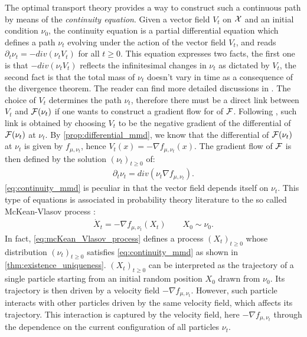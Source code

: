 The optimal transport theory provides a way to construct such a continuous path by means of the \textit{continuity equation}. Given a vector field $V_t$ on ${{\mathcal X}}$ and an initial condition $\nu_0$, the continuity equation is a partial differential equation which defines a path $\nu_t$ evolving under the action of the vector field $V_t$, and reads $\partial_t \nu_t = -div(\nu_t V_t)$ for all $t\geq0$.
This equation expresses two facts, the first one is that $-div(\nu_t V_t)$ reflects the infinitesimal changes in $\nu_t$ as dictated by $V_t$, the second fact is that the total mass of $\nu_t$ doesn't vary in time as a consequence of the divergence theorem. The reader can find more detailed discussions in \cite{Santambrogio:2015}.  
The choice of $V_t$ determines the path $\nu_t$, therefore there must be a direct link between $V_t$ and ${{\mathcal F}}(\nu_t)$ if one wants to construct a gradient flow for of ${{\mathcal F}}$. Following  \cite{ambrosio2008gradient}, such link is obtained by choosing $V_t$ to be the negative gradient of the differential of ${{\mathcal F}}(\nu_t)$ at $\nu_t$. By \cref{prop:differential_mmd}, we know that the differential of ${{\mathcal F}}(\nu_t)$  at $\nu_t$ is given by $f_{\mu,\nu_t}$, hence $V_t(x) = -\nabla f_{\mu,\nu_t}(x)$. The
gradient flow of ${{\mathcal F}}$ is then defined by the solution $(\nu_t)_{t\geq 0}$ of:
\begin{align}\label{eq:continuity_mmd}
	\partial_t \nu_t = div(\nu_t \nabla f_{\mu,\nu_t}).
\end{align}
\cref{eq:continuity_mmd} is peculiar in that the vector field depends itself on $\nu_t$. This type of equations is associated in probability theory literature to the so called McKean-Vlasov process \cite{kac1956foundations,mckean1966class}:
\begin{align}\label{eq:mcKean_Vlasov_process}
	\dot{X}_t = -\nabla f_{\mu,\nu_t}(X_t) \qquad X_0\sim \nu_0.
\end{align}
In fact,  \cref{eq:mcKean_Vlasov_process} defines a process $(X_t)_{t\geq 0}$ whose distribution $(\nu_t)_{t\geq 0}$ satisfies \cref{eq:continuity_mmd} as shown in \cref{thm:existence_uniqueness}. 
$(X_t)_{t\geq 0}$ can be interpreted as  the trajectory of a single particle starting from an initial random position $X_0$ drawn from $\nu_0$. Its trajectory is then driven by a velocity field $-\nabla f_{\mu,\nu_t}$. However, such particle interacts with other particles driven by the same velocity field, which affects its trajectory. This interaction is captured by the velocity field, here $-\nabla f_{\mu,\nu_t}$ through the dependence on the current configuration of all particles $\nu_t$.

